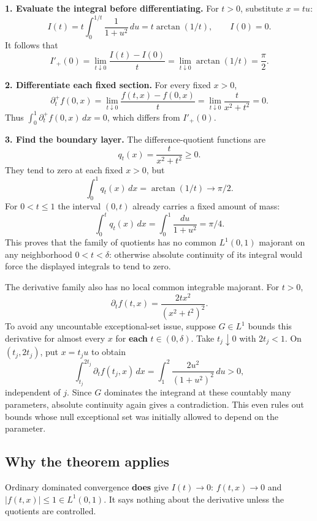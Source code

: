 \documentclass[
  11pt,
]{article}
\begin{document}
\textbf{1. Evaluate the integral before differentiating.} For \(t>0\),
substitute \(x=tu\): \[
I(t)=t\int_0^{1/t}\frac{1}{1+u^2}\,du=t\arctan(1/t),\qquad I(0)=0.
\] It follows that \[
I'_+(0)=\lim_{t\downarrow0}\frac{I(t)-I(0)}{t}
=\lim_{t\downarrow0}\arctan(1/t)=\frac\pi2.
\]

\textbf{2. Differentiate each fixed section.} For every fixed \(x>0\),
\[
\partial_t^+f(0,x)=\lim_{t\downarrow0}\frac{f(t,x)-f(0,x)}{t}
=\lim_{t\downarrow0}\frac{t}{x^2+t^2}=0.
\] Thus \(\int_0^1\partial_t^+f(0,x)\,dx=0\), which differs from
\(I'_+(0)\).

\textbf{3. Find the boundary layer.} The difference-quotient functions
are \[
q_t(x)=\frac{t}{x^2+t^2}\ge0.
\] They tend to zero at each fixed \(x>0\), but \[
\int_0^1q_t(x)\,dx=\arctan(1/t)\longrightarrow\pi/2.
\] For \(0<t\le1\) the interval \((0,t)\) already carries a fixed amount
of mass: \[
\int_0^t q_t(x)\,dx=\int_0^1\frac{du}{1+u^2}=\pi/4.
\] This proves that the family of quotients has no common \(L^1(0,1)\)
majorant on any neighborhood \(0<t<\delta\): otherwise absolute
continuity of its integral would force the displayed integrals to tend
to zero.

The derivative family also has no local common integrable majorant. For
\(t>0\), \[
\partial_t f(t,x)=\frac{2tx^2}{(x^2+t^2)^2}.
\] To avoid any uncountable exceptional-set issue, suppose \(G\in L^1\)
bounds this derivative for almost every \(x\) for \textbf{each}
\(t\in(0,\delta)\). Take \(t_j\downarrow0\) with \(2t_j<1\). On
\((t_j,2t_j)\), put \(x=t_ju\) to obtain \[
\int_{t_j}^{2t_j}\partial_t f(t_j,x)\,dx
=\int_1^2\frac{2u^2}{(1+u^2)^2}\,du>0,
\] independent of \(j\). Since \(G\) dominates the integrand at these
countably many parameters, absolute continuity again gives a
contradiction. This even rules out bounds whose null exceptional set was
initially allowed to depend on the parameter.

\subsection{Why the theorem applies}\label{why-the-theorem-applies-14}

Ordinary dominated convergence \textbf{does} give \(I(t)\to0\):
\(f(t,x)\to0\) and \(|f(t,x)|\le1\in L^1(0,1)\). It says nothing about
the derivative unless the quotients are controlled.
\end{document}
